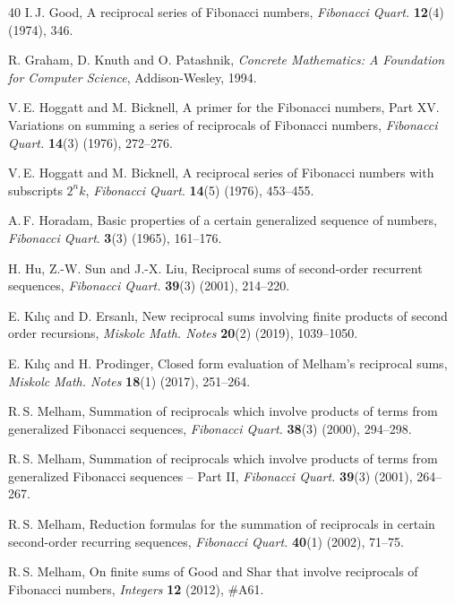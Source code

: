 \documentclass[12pt,reqno]{article}
\begin{document}
\begin{thebibliography}{40}
I.\,J. Good, A reciprocal series of Fibonacci numbers, \textit{Fibonacci Quart.} \textbf{12}(4) (1974), 346.

R. Graham, D. Knuth and 
O. Patashnik, \textit{Concrete Mathematics: A Foundation for Computer Science}, Addison-Wesley, 1994.

V.\,E. Hoggatt and M. Bicknell, A primer for the Fibonacci numbers, Part XV. Variations on summing a series of reciprocals of Fibonacci numbers, \textit{Fibonacci Quart.} \textbf{14}(3) (1976), 272--276.

V.\,E. Hoggatt and M. Bicknell, A reciprocal series of Fibonacci numbers with subscripts $2^nk$, \textit{Fibonacci Quart}. \textbf{14}(5) (1976), 453--455.

A.\,F. Horadam, Basic properties of a certain generalized sequence of numbers, \textit{Fibonacci Quart}. \textbf{3}(3) (1965), 161--176.

H. Hu, Z.-W. Sun and J.-X. Liu, Reciprocal sums of second-order recurrent sequences, \textit{Fibonacci Quart.} \textbf{39}(3) (2001), 214--220.


E. K\i l\i \c c and D. Ersanl\i, New reciprocal sums involving finite products of second order recursions, \textit{Miskolc Math. Notes} \textbf{20}(2) (2019), 1039--1050.

E. K\i l\i \c c and H. Prodinger, Closed form evaluation of Melham's reciprocal sums,  \textit{Miskolc Math. Notes} \textbf{18}(1) (2017), 251--264.



R.\,S. Melham, Summation of reciprocals which involve products of terms from generalized Fibonacci sequences, \textit{Fibonacci Quart.} \textbf{38}(3) (2000), 294--298.

R.\,S. Melham, Summation of reciprocals which involve products of terms from generalized Fibonacci sequences -- Part II, \textit{
Fibonacci Quart.} \textbf{39}(3) (2001), 264--267.

R.\,S. Melham, Reduction formulas for the summation of reciprocals in certain second-order recurring sequences, \textit{Fibonacci Quart.} \textbf{40}(1) (2002), 71--75.

R.\,S. Melham, On finite sums of Good and Shar that involve reciprocals of Fibonacci numbers, \textit{Integers} \textbf{12} (2012), \#A61.


\end{thebibliography}
\end{document}
